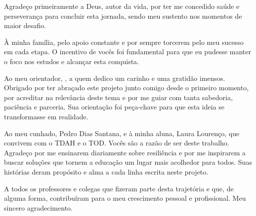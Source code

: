 
\begin{agradecimentos}[AGRADECIMENTOS]

    Agradeço primeiramente a Deus, autor da vida, por ter me concedido saúde e perseverança para concluir esta jornada, sendo meu sustento nos momentos de maior desafio.

    À minha família, pelo apoio constante e por sempre torcerem pelo meu sucesso em cada etapa. O incentivo de vocês foi fundamental para que eu pudesse manter o foco nos estudos e alcançar esta conquista.
    
    Ao meu orientador, \orientador, a quem dedico um carinho e uma gratidão imensos. Obrigado por ter abraçado este projeto junto comigo desde o primeiro momento, por acreditar na relevância deste tema e por me guiar com tanta sabedoria, paciência e parceria. Sua orientação foi peça-chave para que esta ideia se transformasse em realidade.
    
    Ao meu cunhado, Pedro Dias Santana, e à minha aluna, Laura Lourenço, que convivem com o TDAH e o TOD. Vocês são a razão de ser deste trabalho. Agradeço por me ensinarem diariamente sobre resiliência e por me inspirarem a buscar soluções que tornem a educação um lugar mais acolhedor para todos. Suas histórias deram propósito e alma a cada linha escrita neste projeto.
    
    A todos os professores e colegas que fizeram parte desta trajetória e que, de alguma forma, contribuíram para o meu crescimento pessoal e profissional. Meu sincero agradecimento.

\end{agradecimentos}
